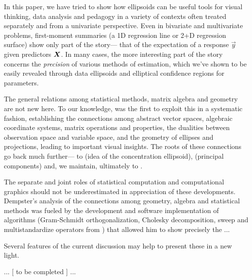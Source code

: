 In this paper, we have tried to show how ellipsoids can be useful tools for
visual thinking, data analysis and pedagogy in a variety of contexts often
treated separately and from a univariate perspective.  Even in bivariate 
and multivariate problems, first-moment summaries (a 1D regression line
or 2+D regression surface) show only part of the story--- that of the
expectation of a response $\vec{y}$ given predictors $\bm{X}$.
In many cases, the more interesting part of the story concerns the 
\emph{precision} of various methods of estimation, which we've shown
to be easily revealed through data ellipsoids and
elliptical confidence regions for parameters.

The general relations among statistical methods, matrix algebra and geometry are
not new here.  To our knowledge, \citet{Dempster:69} was the first to exploit this
in a systematic fashion, establishing the connections among abstract vector spaces,
algebraic coordinate systems, matrix operations and properties, the dualities
between observation space and variable space,
 and the geometry
of ellipses and projections, leading to important visual insights.%
The roots of these connections go back much further---
to 
\citet{Cramer:1946} (idea of the concentration ellipsoid),
\citet{Hotelling:1933} (principal components)
and, we maintain, ultimately to \citet{Galton:1886}.

The separate and joint roles of statistical computation and computational graphics should not be underestimated
in appreciation of these developments.  Dempster's analysis of the connections among geometry, algebra and
statistical methods was fueled by the development and software implementation of algorithms 
(Gram-Schmidt orthogonalization, Cholesky decomposition, sweep and multistandardize operators from
\citet{Beaton:64})
that allowed him to show precisely the ...

Several features of the current discussion may help to present these in a
new light.  

... [ to be completed ] ...




